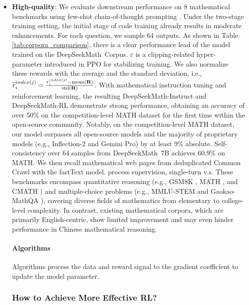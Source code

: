 \begin{itemize}[topsep=0pt]
\begin{itemize}[topsep=0pt]
\begin{itemize}[topsep=0pt]
    \item \textbf{High-quality}:
    We evaluate downstream performance on 8 mathematical benchmarks using few-shot chain-of-thought prompting \cite{cot}. Under the two-stage training setting, the initial stage of code training already results in moderate enhancements. For each question, we sample $64$ outputs. As shown in Table \ref{tab:corpora_comparison}, there is a clear performance lead of the model trained on the DeepSeekMath~Corpus. $\varepsilon$ is a clipping-related hyper-parameter introduced in PPO for stabilizing training. We also normalize these rewards with the average and the standard deviation, i.e., $\widetilde{r}_i^{index(j)} = \frac{r_i^{index(j)} - {\rm mean(\mathbf{R})}}{{\rm std(\mathbf{R})}}$. With mathematical instruction tuning and reinforcement learning, the resulting DeepSeekMath-Instruct and DeepSeekMath-RL demonstrate strong performance, obtaining an accuracy of over 50\% on the competition-level MATH dataset for the first time within the open-source community. Notably, on the competition-level MATH dataset, our model surpasses all open-source models and the majority of proprietary models (e.g., Inflection-2 and Gemini Pro) by at least 9\% absolute. Self-consistency over 64 samples from DeepSeekMath~7B achieves 60.9\% on MATH. We then recall mathematical web pages from deduplicated Common Crawl with the fastText model. process supervision, single-turn v.s. These benchmarks encompass quantitative reasoning (e.g., GSM8K \citep{gsm8k}, MATH \citep{MATH}, and CMATH \citep{wei2023cmath}) and multiple-choice problems (e.g., MMLU-STEM \citep{mmlu} and Gaokao-MathQA \citep{agieval}), covering diverse fields of mathematics from elementary to college-level complexity. In contrast, existing mathematical corpora, which are primarily English-centric, show limited improvement and may even hinder performance in Chinese mathematical reasoning. \paragraph{Algorithms} Algorithms process the data and reward signal to the gradient coefficient to update the model parameter. \subsubsection{How to Achieve More Effective RL?}
\label{sec:effec_rl}

\end{itemize}
\end{itemize}
\end{itemize}
